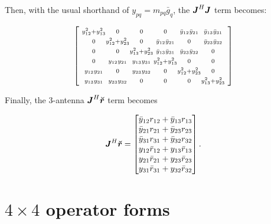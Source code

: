 \documentclass[useAMS,usenatbib]{mn2e}
\makeatletter
\newcommand{\mat}[1]{{\bmath{#1}}}
\newcommand{\JJ}{\mat{J}} %
\newcommand{\Matrix}[2]{\left [ \begin{array}{@{}#1@{}}#2\end{array} \right ]}
\newcommand{\AUG}[1]{\bmath{\breve{#1}}}
\newcommand{\Rr}{\AUG{r}}
\numberwithin{equation}{section}
\makeatother
\begin{document}
Then, with the usual shorthand of $y_{pq} = m_{pq} \bar{g}_q$, the
$\JJ^H\JJ$ term becomes:

\begin{equation}
\label{eq:JHJ:3ant}
\Matrix{@{~}c@{}c@{}c@{}c@{}c@{}c@{~}}{
\scriptstyle\yysq{12}{13} &\scriptstyle 0             &\scriptstyle 0             &\scriptstyle 0             &\scriptstyle \bb{1}{2}       &\scriptstyle \bb{1}{3} \\
\scriptstyle0             &\scriptstyle \yysq{12}{23} &\scriptstyle 0             &\scriptstyle \bb{1}{2}       &\scriptstyle 0             &\scriptstyle \bb{2}{3} \\
\scriptstyle0             &\scriptstyle 0             &\scriptstyle \yysq{13}{23} &\scriptstyle \bb{1}{3}       &\scriptstyle \bb{2}{3}       &\scriptstyle 0       \\
\scriptstyle0             &\scriptstyle \bbb{1}{2}      &\scriptstyle \bbb{1}{3}      &\scriptstyle \yysq{12}{13} &\scriptstyle 0             &\scriptstyle 0       \\ 
\scriptstyle\bbb{1}{2}      &\scriptstyle 0             &\scriptstyle \bbb{2}{3}      &\scriptstyle 0             &\scriptstyle \yysq{12}{23} &\scriptstyle 0 \\
\scriptstyle\bbb{1}{3}      &\scriptstyle \bbb{2}{3}      &\scriptstyle 0             &\scriptstyle 0             &\scriptstyle 0             &\scriptstyle  \yysq{13}{23} \\
}
\end{equation}

Finally, the 3-antenna $\JJ^H\Rr$ term becomes

\begin{equation}
\label{eq:JHR:3ant}
\JJ^H\Rr = \Matrix{c}{
\bar{y}_{12} r_{12} + \bar{y}_{13} r_{13} \\
\bar{y}_{21} r_{21} + \bar{y}_{23} r_{23} \\
\bar{y}_{31} r_{31} + \bar{y}_{32} r_{32} \\
y_{12} \bar{r}_{12} + y_{13} \bar{r}_{13}   \\
y_{21} \bar{r}_{21} + y_{23} \bar{r}_{23}   \\
y_{31} \bar{r}_{31} + y_{32} \bar{r}_{32}   \\
}.
\end{equation}

\section{$4\times4$ operator forms}
\label{app:4x4}
\end{document}
